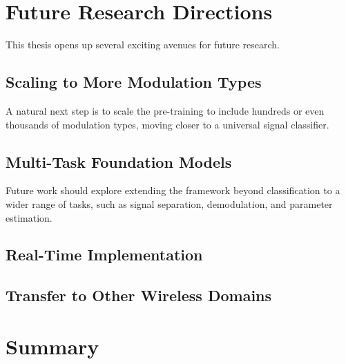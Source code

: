 \section{Future Research Directions}
This thesis opens up several exciting avenues for future research.

\subsection{Scaling to More Modulation Types}
A natural next step is to scale the pre-training to include hundreds or even thousands of modulation types, moving closer to a universal signal classifier.

\subsection{Multi-Task Foundation Models}
Future work should explore extending the framework beyond classification to a wider range of tasks, such as signal separation, demodulation, and parameter estimation.


\subsection{Real-Time Implementation}

\subsection{Transfer to Other Wireless Domains}

\section{Summary}
